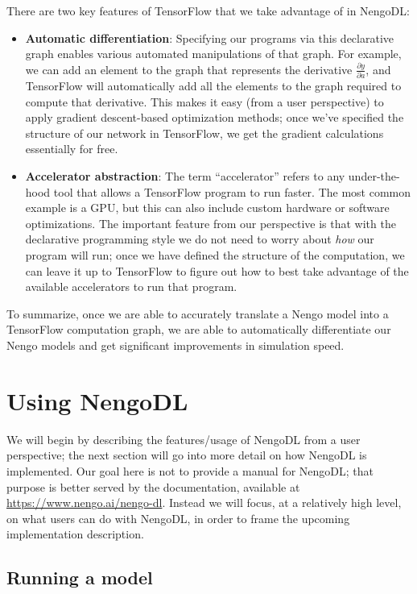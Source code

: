 \documentclass{article}
\begin{document}
There are two key features of TensorFlow that we take advantage of in NengoDL:

\begin{itemize}
\item {\bf Automatic differentiation}: Specifying our programs via this declarative graph enables various automated manipulations of that graph.  For example, we can add an element to the graph that represents the derivative $\frac{\partial y}{\partial a}$, and TensorFlow will automatically add all the elements to the graph required to compute that derivative.  This makes it easy (from a user perspective) to apply gradient descent-based optimization methods; once we've specified the structure of our network in TensorFlow, we get the gradient calculations essentially for free.
\item {\bf Accelerator abstraction}: The term ``accelerator'' refers to any under-the-hood tool that allows a TensorFlow program to run faster.  The most common example is a GPU, but this can also include custom hardware or software optimizations.  The important feature from our perspective is that with the declarative programming style we do not need to worry about \emph{how} our program will run; once we have defined the structure of the computation, we can leave it up to TensorFlow to figure out how to best take advantage of the available accelerators to run that program.
\end{itemize}

To summarize, once we are able to accurately translate a Nengo model into a TensorFlow computation graph, we are able to automatically differentiate our Nengo models and get significant improvements in simulation speed.

\section{Using NengoDL}
\label{sec:usage}

We will begin by describing the features/usage of NengoDL from a user perspective; the next section will go into more detail on how NengoDL is implemented.  Our goal here is not to provide a manual for NengoDL; that purpose is better served by the documentation, available at \url{https://www.nengo.ai/nengo-dl}.  Instead we will focus, at a relatively high level, on what users can do with NengoDL, in order to frame the upcoming implementation description.

\subsection{Running a model}
\end{document}
